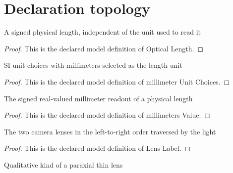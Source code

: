 \section{Declaration topology}
\begin{definition}
  \label{def:physics:phyx-mini-0165:phyxminiproblems-problemphyxmini0165-opticallength}
  A signed physical length, independent of the unit used to read it
\end{definition}
\begin{proof}
  This is the declared model definition of Optical Length.
\end{proof}
\begin{definition}
  \label{def:physics:phyx-mini-0165:phyxminiproblems-problemphyxmini0165-millimeterunitchoices}
  SI unit choices with millimeters selected as the length unit
\end{definition}
\begin{proof}
  This is the declared model definition of millimeter Unit Choices.
\end{proof}
\begin{definition}
  \label{def:physics:phyx-mini-0165:phyxminiproblems-problemphyxmini0165-millimetersvalue}
  The signed real-valued millimeter readout of a physical length
\end{definition}
\begin{proof}
  This is the declared model definition of millimeters Value.
\end{proof}
\begin{definition}
  \label{def:physics:phyx-mini-0165:phyxminiproblems-problemphyxmini0165-lenslabel}
  The two camera lenses in the left-to-right order traversed by the light
\end{definition}
\begin{proof}
  This is the declared model definition of Lens Label.
\end{proof}
\begin{definition}
  \label{def:physics:phyx-mini-0165:phyxminiproblems-problemphyxmini0165-thinlenskind}
  Qualitative kind of a paraxial thin lens
\end{definition}
